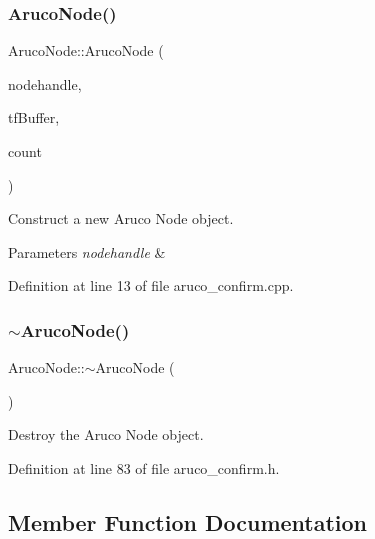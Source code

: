 \subsubsection{\texorpdfstring{Aruco\+Node()}{ArucoNode()}}
{\footnotesize\ttfamily Aruco\+Node\+::\+Aruco\+Node (\begin{DoxyParamCaption}\item[{ros\+::\+Node\+Handle $\ast$}]{nodehandle,  }\item[{tf2\+\_\+ros\+::\+Buffer \&}]{tf\+Buffer,  }\item[{int}]{count }\end{DoxyParamCaption})}



Construct a new Aruco Node object. 


\begin{DoxyParams}{Parameters}
{\em nodehandle} & \\
\hline
\end{DoxyParams}


Definition at line 13 of file aruco\+\_\+confirm.\+cpp.

\mbox{\label{class_aruco_node_a134694163a28530a800198e2c039eb25}} 
\subsubsection{\texorpdfstring{$\sim$\+Aruco\+Node()}{~ArucoNode()}}
{\footnotesize\ttfamily Aruco\+Node\+::$\sim$\+Aruco\+Node (\begin{DoxyParamCaption}{ }\end{DoxyParamCaption})\hspace{0.3cm}{\ttfamily [inline]}}



Destroy the Aruco Node object. 



Definition at line 83 of file aruco\+\_\+confirm.\+h.



\subsection{Member Function Documentation}
\mbox{\label{class_aruco_node_af68c583d73a36c483d28b96a6fd22713}} 

